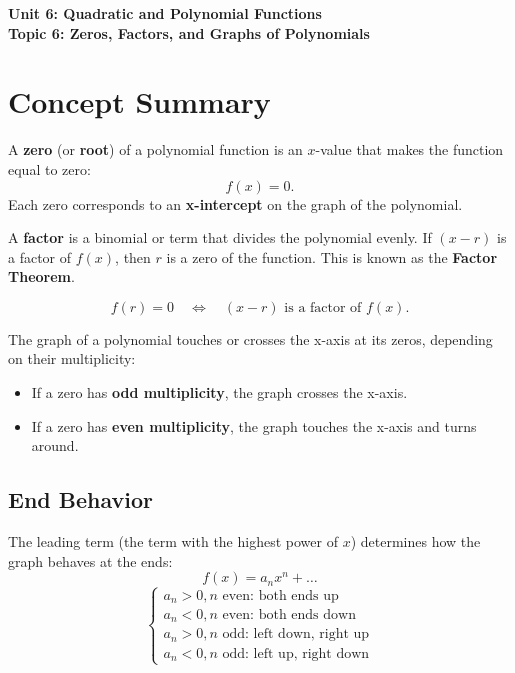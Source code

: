 \documentclass[14pt]{extarticle}
\begin{document}
\raggedright
{}

\begin{center}
    \LARGE \textbf{Unit 6: Quadratic and Polynomial Functions} \\[6pt]
    \Large \textbf{Topic 6: Zeros, Factors, and Graphs of Polynomials}
\end{center}

\vspace{1em}

\section*{Concept Summary}

A \textbf{zero} (or \textbf{root}) of a polynomial function is an \(x\)-value that makes the function equal to zero:
\[
f(x) = 0.
\]
Each zero corresponds to an \textbf{x-intercept} on the graph of the polynomial.

A \textbf{factor} is a binomial or term that divides the polynomial evenly.  
If \((x - r)\) is a factor of \(f(x)\), then \(r\) is a zero of the function.  
This is known as the \textbf{Factor Theorem}.

\[
f(r) = 0 \quad \Leftrightarrow \quad (x - r) \text{ is a factor of } f(x).
\]

The graph of a polynomial touches or crosses the x-axis at its zeros, depending on their multiplicity:
\begin{itemize}
  \item If a zero has \textbf{odd multiplicity}, the graph crosses the x-axis.
  \item If a zero has \textbf{even multiplicity}, the graph touches the x-axis and turns around.
\end{itemize}

\subsection*{End Behavior}
The leading term (the term with the highest power of \(x\)) determines how the graph behaves at the ends:
\[
f(x) = a_nx^n + \dots
\]
\[
\begin{cases}
a_n > 0, n \text{ even: both ends up} \\
a_n < 0, n \text{ even: both ends down} \\
a_n > 0, n \text{ odd: left down, right up} \\
a_n < 0, n \text{ odd: left up, right down}
\end{cases}
\]
\end{document}
